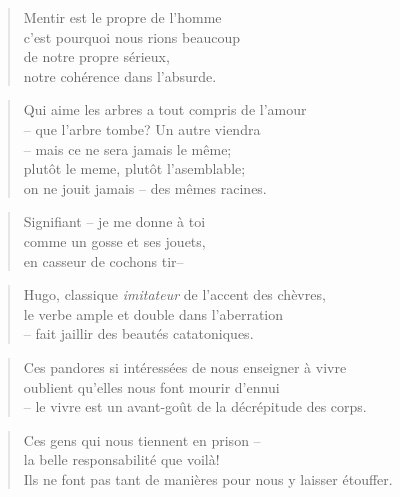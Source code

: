   \begin{verse}
    Mentir est le propre de l’homme\\
    c’est pourquoi nous rions beaucoup\\
    de notre propre sérieux,\\
    notre cohérence dans l’absurde.
  \end{verse}
  \begin{verse}
    Qui aime les arbres a tout compris de l’amour\\
    -- que l’arbre tombe? Un autre viendra\\
    -- mais ce ne sera jamais le même;\\
    plutôt le meme, plutôt l’asemblable;\\
    on ne jouit jamais -- des mêmes racines.
  \end{verse}
  \begin{verse}
    Signifiant -- je me donne à toi\\
    comme un gosse et ses jouets,\\
    en casseur de cochons tir--
  \end{verse}
  \begin{center}
  \end{center}

  \begin{verse}
    Hugo, classique \emph{imitateur} de l’accent des chèvres,\\
    le verbe ample et double dans l’aberration\\
    -- fait jaillir des beautés catatoniques.
  \end{verse}

  \begin{verse}
    Ces pandores si intéressées de nous enseigner à vivre\\
    oublient qu’elles nous font mourir d’ennui\\
    -- le vivre est un avant-goût de la décrépitude des corps.
  \end{verse}
  \begin{verse}
    Ces gens qui nous tiennent en prison --\\
    la belle responsabilité que voilà!\\
    Ils ne font pas tant de manières pour nous y laisser étouffer.
  \end{verse}
